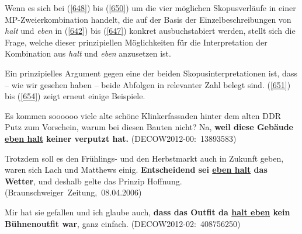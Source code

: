 Wenn es sich bei (\ref{648}) bis (\ref{650}) um die vier möglichen Skopusverläufe in einer MP-Zweierkombination handelt, die auf der Basis der Einzelbeschreibungen von \textit{halt} und \textit{eben} in (\ref{642}) bis (\ref{647}) konkret ausbuchstabiert werden, stellt sich die Frage, welche dieser prinzipiellen Möglichkeiten für die Interpretation der Kombination aus \textit{halt} und \textit{eben} anzusetzen ist.

Ein prinzipielles Argument gegen eine der beiden Skopusinterpretationen ist, dass – wie wir gesehen haben – beide Abfolgen in relevanter Zahl belegt sind. (\ref{651}) bis (\ref{654}) zeigt erneut einige Beispiele.

\begin{exe}
	\ex\label{651} 
	Es kommen soooooo viele alte schöne Klinkerfassaden hinter dem alten DDR Putz 
	zum Vorschein, warum bei diesen Bauten nicht? Na, \textbf{weil diese Gebäude \underline{eben halt} keiner verputzt hat.}	
	\hfill\hbox {(DECOW2012-00: 13893583)}
\end{exe}	          	                              

\begin{exe}
	\ex\label{652} 
	Trotzdem soll es den Frühlings- und den Herbstmarkt auch in Zukunft geben, waren sich Lach und Matthews einig. 					\textbf{Entscheidend sei \underline{eben halt} das Wetter}, und deshalb gelte das Prinzip Hoffnung.      
	\newline
	\hbox{}\hfill\hbox {(Braunschweiger Zeitung, 08.04.2006)}
\end{exe}			

\begin{exe}
	\ex\label{653} 
	Mir hat sie gefallen und ich glaube auch, \textbf{dass das Outfit da \underline{halt eben} kein \glqq Bühnenoutfit\grqq{} war}, ganz einfach.  
	\hfill\hbox {(DECOW2012-02: 408756250)}
\end{exe}

